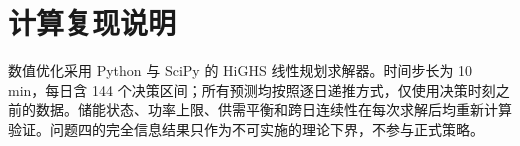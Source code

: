 \section{计算复现说明}

数值优化采用 Python 与 SciPy 的 HiGHS 线性规划求解器。时间步长为 10 min，每日含 144 个决策区间；所有预测均按照逐日递推方式，仅使用决策时刻之前的数据。储能状态、功率上限、供需平衡和跨日连续性在每次求解后均重新计算验证。问题四的完全信息结果只作为不可实施的理论下界，不参与正式策略。
